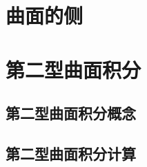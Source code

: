 \section{曲面的侧}
\begin{exercise}
\item
\end{exercise}
\section{第二型曲面积分}
\subsection{第二型曲面积分概念}
\subsection{第二型曲面积分计算}
\begin{exercise}
\item
\end{exercise}
\begin{exercise*}
\item
\end{exercise*}




\endinput
